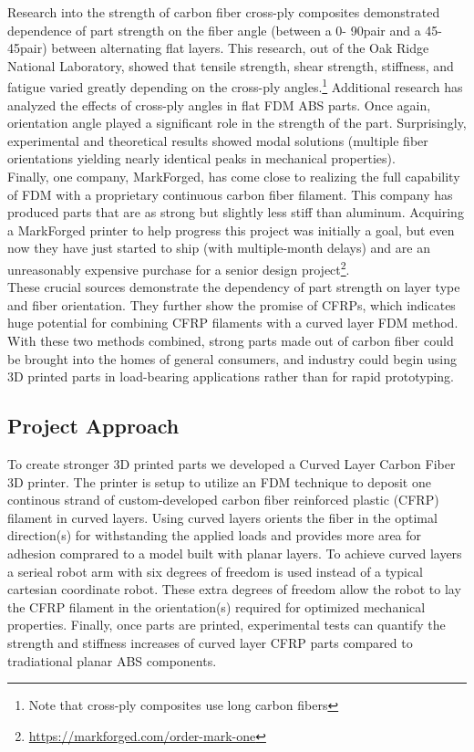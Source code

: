 Research into the strength of carbon fiber cross-ply composites demonstrated dependence of part strength on the fiber angle (between a 0\degree - 90\degree pair and a 45\degree - 45\degree pair) between alternating flat layers. This research, out of the Oak Ridge National Laboratory, showed that tensile strength, shear strength, stiffness, and fatigue varied greatly depending on the cross-ply angles.\footnote{Note that cross-ply composites use long carbon fibers}\cite{ornl} Additional research has analyzed the effects of cross-ply angles \cite{cantilever} in flat FDM ABS parts. Once again, orientation angle played a significant role in the strength of the part. Surprisingly, experimental and theoretical results showed modal solutions (multiple fiber orientations yielding nearly identical peaks in mechanical properties).\\

Finally, one company, MarkForged\cite{markforged}, has come close to realizing the full capability of FDM with a proprietary continuous carbon fiber filament. This company has produced parts that are as strong but slightly less stiff than aluminum. Acquiring a MarkForged printer to help progress this project was initially a goal, but even now they have just started to ship (with multiple-month delays) and are an unreasonably expensive purchase for a senior design project\footnote{\url{https://markforged.com/order-mark-one}}.\\

These crucial sources demonstrate the dependency of part strength on layer type and fiber orientation. They further show the promise of CFRPs, which indicates huge potential for combining CFRP filaments with a curved layer FDM method. With these two methods combined, strong parts made out of carbon fiber could be brought into the homes of general consumers, and industry could begin using 3D printed parts in load-bearing applications rather than for rapid prototyping.\\

\subsection{Project Approach}

\indent

To create stronger 3D printed parts we developed a Curved Layer Carbon Fiber 3D printer. The printer is setup to utilize an FDM technique to deposit one continous strand of custom-developed carbon fiber reinforced plastic (CFRP) filament in curved layers. Using curved layers orients the fiber in the optimal direction(s) for withstanding the applied loads and provides more area for adhesion comprared to a model built with planar layers. To achieve curved layers a serieal robot arm with six degrees of freedom is used instead of a typical cartesian coordinate robot. These extra degrees of freedom allow the robot to lay the CFRP filament in the orientation(s) required for optimized mechanical properties. Finally, once parts are printed, experimental tests can quantify the strength and stiffness increases of curved layer CFRP parts compared to tradiational planar ABS components.\\

